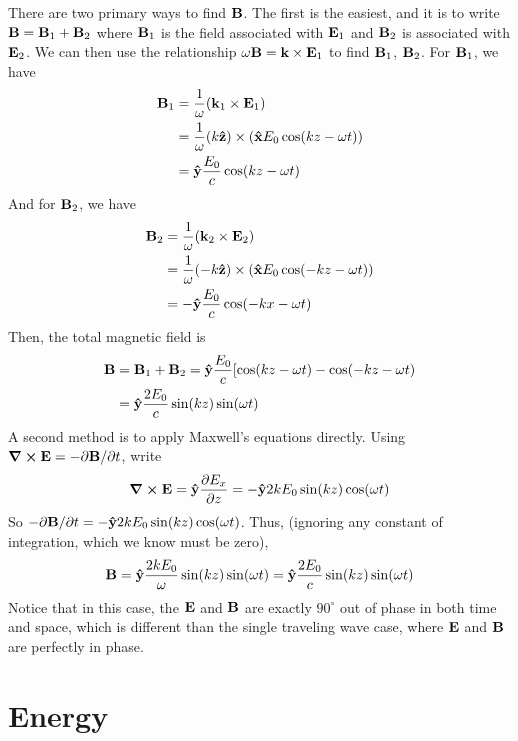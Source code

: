 There are two primary ways to find $\mathbf{B}$. The first is the easiest, and it is to write $\mathbf{B} = \mathbf{B}_1 + \mathbf{B}_2$ where $\mathbf{B}_1$ is the field associated with $\mathbf{E}_1$ and $\mathbf{B}_2$ is associated with $\mathbf{E}_2$. We can then use the relationship $\omega \mathbf{B} = \mathbf{k} \times \mathbf{E}_1$ to find $\mathbf{B}_1$, $\mathbf{B}_2$. For $\mathbf{B}_1$, we have
\begin{align*}
    \mbf B_1 &= \frac{1}{\omega}(\mbf k_1 \times \mbf E_1) \\
    &= \frac{1}{\omega} \pqty{k\zhat } \times \pqty{\xhat E_0 \cos(kz-\omega t)} \\
    &= \yhat\frac{E_0}{c}\cos(kz-\omega t) 
\end{align*}
And for $\mathbf{B}_2$, we have
\begin{align*}
    \mbf B_2 &= \frac{1}{\omega}(\mbf k_2 \times \mbf E_2) \\
    &= \frac{1}{\omega}\pqty{-k\zhat}\times \pqty{\xhat E_0 \cos(-kz-\omega t)} \\
    &= -\yhat\frac{E_0}{c}\cos(-kx-\omega t)
\end{align*}
Then, the total magnetic field is
\begin{align*}
    \mathbf{B} &= \mathbf{B}_1 + \mathbf{B}_2 = \mathbf{\hat{y}} \frac{E_0}{c}[\cos(kz-\omega t)-\cos(-kz-\omega t) \\
    &= \mathbf{\hat{y}} \frac{2E_0}{c}\sin(kz)\sin(\omega t)
\end{align*}
A second method is to apply Maxwell's equations directly. Using $\curl \mathbf{E} = -\partial \mathbf{B}/\partial t$, write
\begin{align*}
    \curl \mathbf{E} = \mathbf{\hat{y}} \pdv{E_x}{z} = -\mathbf{\hat{y}} 2kE_0\sin(kz)\cos(\omega t)
\end{align*}
So $-\partial \mathbf{B}/\partial t = -\mathbf{\hat{y}} 2kE_0\sin(kz)\cos(\omega t)$. Thus, (ignoring any constant of integration, which we know must be zero),
\[ \mathbf{B} = \mathbf{\hat{y}} \frac{2kE_0}{\omega}\sin(kz)\sin(\omega t) = \mathbf{\hat{y}}\frac{2E_0}{c}\sin(kz)\sin(\omega t)\]
Notice that in this case, the $\mathbf{E}$ and $\mathbf{B}$ are exactly $90^\circ$ out of phase in both time and space, which is different than the single traveling wave case, where $\mathbf{E}$ and $\mathbf{B}$ are perfectly in phase. 
\section{Energy}

